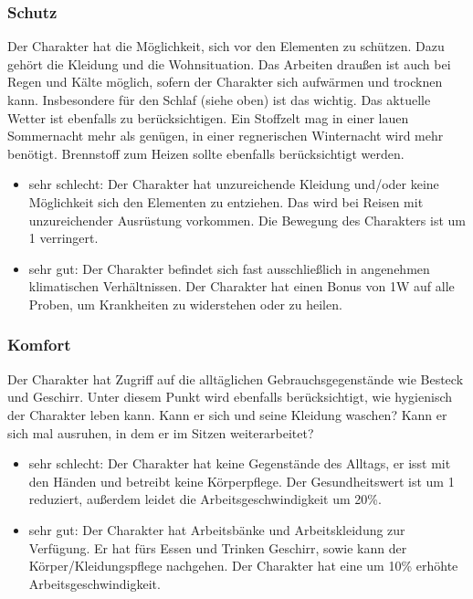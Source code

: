 \documentclass{article}
\begin{document}
\subsubsection{Schutz}

Der Charakter hat die Möglichkeit, sich vor den Elementen zu schützen. Dazu gehört die Kleidung und die Wohnsituation.
Das Arbeiten draußen ist auch bei Regen und Kälte möglich, sofern der Charakter sich aufwärmen und trocknen kann.
Insbesondere für den Schlaf (siehe oben) ist das wichtig. Das aktuelle Wetter ist ebenfalls zu berücksichtigen. Ein
Stoffzelt mag in einer lauen Sommernacht mehr als genügen, in einer regnerischen Winternacht wird mehr benötigt.
Brennstoff zum Heizen sollte ebenfalls berücksichtigt werden.

\begin{itemize}
\item sehr schlecht: Der Charakter hat unzureichende Kleidung und/oder keine Möglichkeit sich den Elementen zu entziehen. Das wird bei Reisen mit unzureichender Ausrüstung vorkommen. Die Bewegung des Charakters ist um 1 verringert.
\item sehr gut: Der Charakter befindet sich fast ausschließlich in angenehmen klimatischen Verhältnissen. Der Charakter hat einen Bonus von 1W auf alle Proben, um Krankheiten zu widerstehen oder zu heilen.
\end{itemize}

\subsubsection{Komfort}

Der Charakter hat Zugriff auf die alltäglichen Gebrauchsgegenstände wie Besteck und Geschirr. Unter diesem Punkt wird
ebenfalls berücksichtigt, wie hygienisch der Charakter leben kann. Kann er sich und seine Kleidung waschen? Kann er
sich mal ausruhen, in dem er im Sitzen weiterarbeitet?

\begin{itemize}
\item sehr schlecht: Der Charakter hat keine Gegenstände des Alltags, er isst mit den Händen und betreibt keine Körperpflege. Der Gesundheitswert ist um 1 reduziert, außerdem leidet die Arbeitsgeschwindigkeit um 20\%.
\item sehr gut: Der Charakter hat Arbeitsbänke und Arbeitskleidung zur Verfügung. Er hat fürs Essen und Trinken Geschirr, sowie kann der Körper/Kleidungspflege nachgehen. Der Charakter hat eine um 10\% erhöhte Arbeitsgeschwindigkeit.
\end{itemize}
\end{document}
